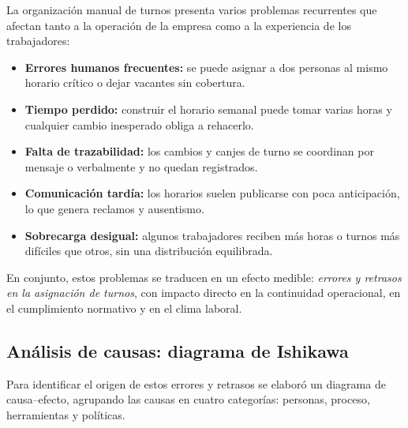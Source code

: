 \documentclass[12pt,letterpaper]{article}
\begin{document}
La organización manual de turnos presenta varios problemas recurrentes que afectan tanto a la operación de la empresa como a la experiencia de los trabajadores:

\begin{itemize}[leftmargin=1.4em,itemsep=0.2em]
  \item \textbf{Errores humanos frecuentes:} se puede asignar a dos personas al mismo horario crítico o dejar vacantes sin cobertura.
  \item \textbf{Tiempo perdido:} construir el horario semanal puede tomar varias horas y cualquier cambio inesperado obliga a rehacerlo.
  \item \textbf{Falta de trazabilidad:} los cambios y canjes de turno se coordinan por mensaje o verbalmente y no quedan registrados.
  \item \textbf{Comunicación tardía:} los horarios suelen publicarse con poca anticipación, lo que genera reclamos y ausentismo.
  \item \textbf{Sobrecarga desigual:} algunos trabajadores reciben más horas o turnos más difíciles que otros, sin una distribución equilibrada.
\end{itemize}

En conjunto, estos problemas se traducen en un efecto medible: \textit{errores y retrasos en la asignación de turnos}, con impacto directo en la continuidad operacional, en el cumplimiento normativo y en el clima laboral.

\subsection{Análisis de causas: diagrama de Ishikawa}

Para identificar el origen de estos errores y retrasos se elaboró un diagrama de causa--efecto, agrupando las causas en cuatro categorías: personas, proceso, herramientas y políticas.
\end{document}
